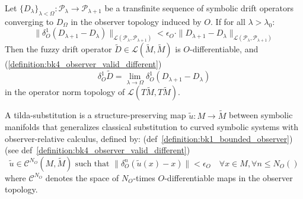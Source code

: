 \begin{lemma} \label{lemma:bk4_convergence_of_symbolic_drift}

Let $\{D_\lambda\}_{\lambda < \Omega}: \mathcal{P}_\lambda \to \mathcal{P}_{\lambda+1}$ be a transfinite sequence of symbolic drift operators converging to $D_\Omega$ in the observer topology induced by $O$. If for all $\lambda > \lambda_0$:
\[
\|\delta^1_O(D_{\lambda+1} - D_\lambda)\|_{\mathcal{L}(\mathcal{P}_\lambda, \mathcal{P}_{\lambda+1})} < \epsilon_O \cdot \|D_{\lambda+1} - D_\lambda\|_{\mathcal{L}(\mathcal{P}_\lambda, \mathcal{P}_{\lambda+1})}
\]
Then the fuzzy drift operator $\widetilde{D} \in \mathcal{L}(\widetilde{M}, \widetilde{M})$ is $O$-differentiable, and (\ref{definition:bk4_observer_valid_different})
\[
\delta^1_O \widetilde{D} = \lim_{\lambda \to \Omega} \delta^1_O(D_{\lambda+1} - D_\lambda)
\]
in the operator norm topology of $\mathcal{L}(T\widetilde{M}, T\widetilde{M})$.
\end{lemma}
\begin{definition} \label{definition:bk4_tilda_substitution}
A tilda-substitution is a structure-preserving map $\tilde{u}: M \to \widetilde{M}$ between symbolic manifolds that generalizes classical substitution to curved symbolic systems with observer-relative calculus, defined by: (def~\ref{definition:bk1_bounded_observer}) (see def~\ref{definition:bk4_observer_valid_different})
\[
\tilde{u} \in \mathcal{C}^{N_O}(M, \widetilde{M}) \text{ such that } \|\delta^n_O(\tilde{u}(x) - x)\| < \epsilon_O \quad \forall x \in M, \forall n \leq N_O ()
\]
where $\mathcal{C}^{N_O}$ denotes the space of $N_O$-times $O$-differentiable maps in the observer topology.
\end{definition}
